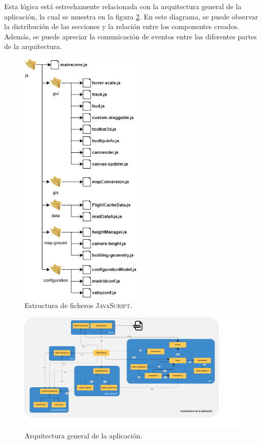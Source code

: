 \documentclass[a4paper, 11pt]{book}
\begin{document}
Esta lógica está estrechamente relacionada con la arquitectura general de la aplicación, la cual se muestra en la figura \ref{fig:arquitectura}. 
En este diagrama, se puede observar la distribución de las secciones y la relación entre los componentes creados. Además, se puede apreciar la comunicación de eventos entre las diferentes partes de la arquitectura.
\begin{figure}[h]
  \centering
  \includegraphics[width=6cm, keepaspectratio]{img/ficheros.drawio.png}
  \caption{Estructura de ficheros \textsc{JavaScript}.}
  \label{fig:javascriptFiles}
\end{figure}

\begin{center}
\begin{figure}[h]
  \centering
  \includegraphics[width=18cm, keepaspectratio]{img/Arquitectura.png}
  \caption{Arquitectura general de la aplicación.}
  \label{fig:arquitectura}
\end{figure}
\end{center}
\end{document}
